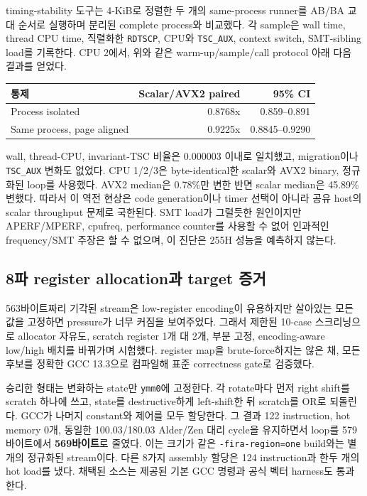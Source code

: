 \documentclass[11pt,a4paper]{article}
\begin{document}
timing-stability 도구는 4-KiB로 정렬한 두 개의 same-process
runner를 AB/BA 교대 순서로 실행하며 분리된 complete process와 비교했다.
각 sample은 wall time, thread CPU time, 직렬화한 \texttt{RDTSCP}, CPU와
\texttt{TSC\_AUX}, context switch, SMT-sibling load를 기록한다.  CPU
2에서, 위와 같은 warm-up/sample/call protocol 아래 다음 결과를 얻었다.

\begin{center}
\small
\begin{tabular}{lrr}
\toprule
통제 & Scalar/AVX2 paired & 95\% CI \\
\midrule
Process isolated & 0.8768x & 0.859--0.891 \\
Same process, page aligned & 0.9225x & 0.8845--0.9290 \\
\bottomrule
\end{tabular}
\end{center}

wall, thread-CPU, invariant-TSC 비율은 0.000003 이내로 일치했고,
migration이나 \texttt{TSC\_AUX} 변화도 없었다.  CPU 1/2/3은
byte-identical한 scalar와 AVX2 binary, 정규화된 loop를 사용했다.  AVX2
median은 0.78\%만 변한 반면 scalar median은 45.89\% 변했다.  따라서 이
역전 현상은 code generation이나 timer 선택이 아니라 공유 host의 scalar
throughput 문제로 국한된다.  SMT load가 그럴듯한 원인이지만 APERF/MPERF,
cpufreq, performance counter를 사용할 수 없어 인과적인 frequency/SMT
주장은 할 수 없으며, 이 진단은 255H 성능을 예측하지 않는다.

\subsection{8파 register allocation과 target 증거}

563바이트짜리 기각된 stream은 low-register encoding이 유용하지만
살아있는 모든 값을 고정하면 pressure가 너무 커짐을 보여주었다.  그래서
제한된 10-case 스크리닝으로 allocator
자유도, scratch register 1개 대 2개, 부분 고정, encoding-aware
low/high 배치를 바꿔가며 시험했다.  register map을 brute-force하지는
않은 채, 모든 후보를 정확한 GCC 13.3으로 컴파일해 표준 correctness
gate로 검증했다.

승리한 형태는 변화하는 state만 \texttt{ymm0}에 고정한다.  각 rotate마다
먼저 right shift를 scratch 하나에 쓰고, state를 destructive하게
left-shift한 뒤 scratch를 OR로 되돌린다. GCC가 나머지 constant와 제어를
모두 할당한다.  그 결과 122 instruction, hot memory 0개, 동일한
100.03/180.03 Alder/Zen 대리 cycle을 유지하면서 loop를 579바이트에서
\textbf{569바이트}로 줄였다.  이는 크기가 같은
\texttt{-fira-region=one} build와는 별개의 정규화된 stream이다.  다른
8가지 assembly 할당은 124 instruction과 한두 개의 hot load를 냈다.
채택된 소스는 제공된 기본 GCC 명령과 공식 벡터 harness도 통과한다.
\end{document}

